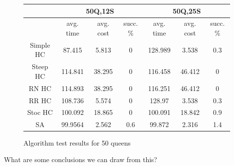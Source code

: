 \documentclass[10pt,a4paper]{article}
\begin{document}
		\begin{figure}[h!]
                        \centering
                        \caption{Algorithm test results for 50 queens}
                        \begin{tabular}{|c|c|c|c|c|c|c|}
                                \hline \hline
                                & \multicolumn{3}{c|}{50Q,12S} & \multicolumn{3}{c|}{50Q,25S} \\
                                \hline
                                &avg. time&avg. cost&succ. \%&avg. time&avg. cost&succ. \% \\
                                \hline \hline
				Simple HC&87.415&5.813&0&128.989&3.538&0.3 \\
                                \hline
				Steep HC&114.841&38.295&0&116.458&46.412&0 \\
                                \hline
				RN HC&114.893&38.295&0&116.251&46.412&0 \\
                                \hline
				RR HC&108.736&5.574&0&128.97&3.538&0.3 \\
                                \hline
				Stoc HC&100.092&18.865&0&100.091&18.842&0.9 \\
                                \hline
				SA&99.9564&2.562&0.6&99.872&2.316&1.4\\
                                \hline
                        \end{tabular}
                \end{figure}
		\clearpage
		What are some conclusions we can draw from this? 
\end{document}
